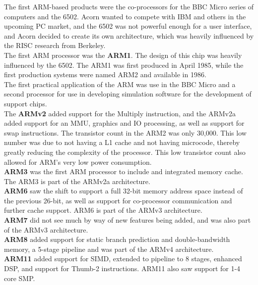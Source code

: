 \documentclass[letterpaper,10pt,titlepage]{article}
\begin{document}
The first ARM-based products were the co-processors for the BBC Micro series of computers and the 6502. Acorn wanted to compete with IBM and others in the upcoming PC market, and the 6502 was not powerful enough for a user interface, and Acorn decided to create its own architecture, which was heavily influenced by the RISC research from Berkeley.\\

The first ARM processor was the \textbf{ARM1}. The design of this chip was heavily influenced by the 6502. The ARM1 was first produced in April 1985, while the first production systems were named ARM2 and available in 1986.\\

The first practical application of the ARM was use in the BBC Micro and a second processor for use in developing simulation software for the development of support chips. \\

The \textbf{ARMv2} added support for the Multiply instruction, and the ARMv2a added support for an MMU, graphics and IO processing, as well as support for swap instructions. The transistor count in the ARM2 was only 30,000. This low number was due to not having a L1 cache and not having microcode, thereby greatly reducing the complexity of the processor. This low transistor count also allowed for ARM's very low power consumption.\\

\textbf{ARM3} was the first ARM processor to include and integrated memory cache. The ARM3 is part of the ARMv2a architecture.\\

\textbf{ARM6} saw the shift to support a full 32-bit memory address space instead of the previous 26-bit, as well as support for co-processor communication and further cache support. ARM6 is part of the ARMv3 architecture.\\

\textbf{ARM7} did not see much by way of new features being added, and was also part of the ARMv3 architecture.\\

\textbf{ARM8} added support for static branch prediction and double-bandwidth memory, a 5-stage pipeline and was part of the ARMv4 architecture.\\

\textbf{ARM11} added support for SIMD, extended to pipeline to 8 stages, enhanced DSP, and support for Thumb-2 instructions. ARM11 also saw support for 1-4 core SMP.\\
\end{document}
